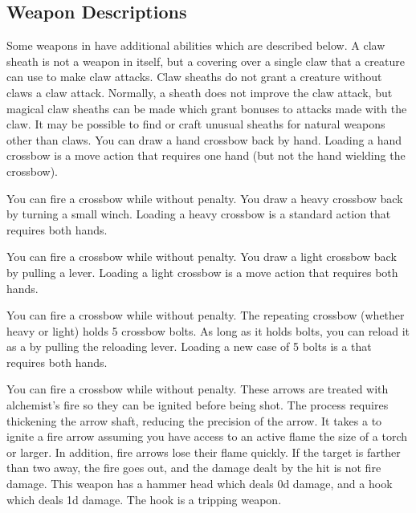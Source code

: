     \subsection{Weapon Descriptions}
        Some weapons in  have additional abilities which are described below.
         A claw sheath is not a weapon in itself, but a covering over a single claw that a creature can use to make claw attacks. Claw sheaths do not grant a creature without claws a claw attack. Normally, a sheath does not improve the claw attack, but magical claw sheaths can be made which grant bonuses to attacks made with the claw. It may be possible to find or craft unusual sheaths for natural weapons other than claws.
         You can draw a hand crossbow back by hand. Loading a hand crossbow is a move action that requires one hand (but not the hand wielding the crossbow).
        \par You can fire a crossbow while \prone without penalty.
         You draw a heavy crossbow back by turning a small winch. Loading a heavy crossbow is a standard action that requires both hands.
        \par You can fire a crossbow while \prone without penalty.
         You draw a light crossbow back by pulling a lever. Loading a light crossbow is a move action that requires both hands.
        \par You can fire a crossbow while \prone without penalty.
         The repeating crossbow (whether heavy or light) holds 5 crossbow bolts. As long as it holds bolts, you can reload it as a  by pulling the reloading lever. Loading a new case of 5 bolts is a  that requires both hands.
        \par You can fire a crossbow while \prone without penalty.
         These arrows are treated with alchemist's fire so they can be ignited before being shot.
        The process requires thickening the arrow shaft, reducing the precision of the arrow.
        It takes a  to ignite a fire arrow assuming you have access to an active flame the size of a torch or larger.
        In addition, fire arrows lose their flame quickly.
        If the target is farther than two  away, the fire goes out, and the damage dealt by the hit is not fire damage.
         This weapon has a hammer head which deals \plus0d damage, and a hook which deals \minus1d damage. The hook is a tripping weapon.
